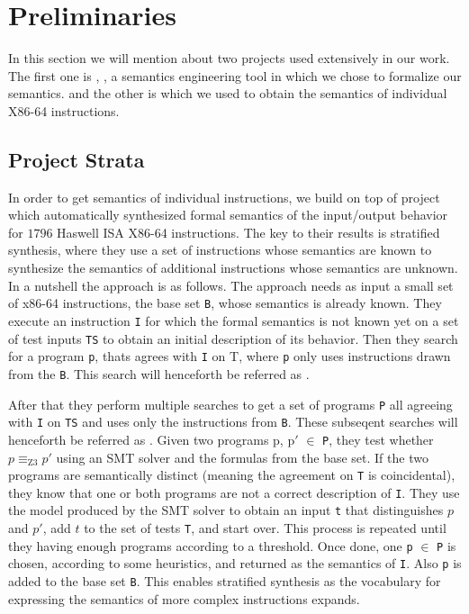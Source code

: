\section{Preliminaries} \label{sec:Prilim}
In this section we will mention about two projects used extensively in our work. The first one is \K{}, , a semantics engineering tool in
which we chose to formalize our semantics. and the other is \Strata which we used to
obtain the semantics of individual X86-64 instructions.    

\subsection{Project Strata}

In order to get semantics of individual instructions, we build on top of project
\Strata~\cite{Heule2016a} which automatically synthesized formal semantics  of
the input/output behavior for $1796$ Haswell ISA X86-64 instructions. The key to
their results is stratified synthesis, where they use a set of instructions
whose semantics are known to synthesize the semantics of additional instructions
whose semantics are unknown. 
In a nutshell the approach is as follows. The approach needs as input  a small set of x86-64 instructions, the base set {\tt B}, whose semantics is already known. They execute
an instruction {\tt I} for which the formal semantics is not known yet on a set of test inputs {\tt TS} to obtain an initial description of its behavior. Then they search for a program {\tt p}, thats agrees with {\tt I} on T,  where {\tt p} only uses instructions drawn from the {\tt B}. This search will henceforth be referred as \initS{}. 



After that they perform multiple searches to get a set of programs {\tt P} all agreeing with {\tt I} on {\tt TS} and uses only the instructions from {\tt B}. These subseqent searches will henceforth be referred as \secS{}. Given two programs p, p$\prime$ $\in$ {\tt P}, they test whether $p\equiv_\text{Z3}p\prime$ using an SMT solver and the formulas from the base set. If the two programs are semantically distinct (meaning
the agreement on {\tt T} is coincidental), they know that one or both programs are not a correct description of {\tt I}. They use the model produced by the SMT solver to obtain an input {\tt t} that distinguishes $p$ and $p\prime$, add $t$ to the set of tests {\tt T}, and start over. This process is  repeated until they having enough programs according to a threshold. Once done, one {\tt p} $\in$ {\tt P} is chosen, according to some heuristics, and returned as the semantics of {\tt I}. Also {\tt p} is added to the base set {\tt B}.  This  enables stratified synthesis  as the vocabulary for expressing the semantics of more complex instructions expands.


